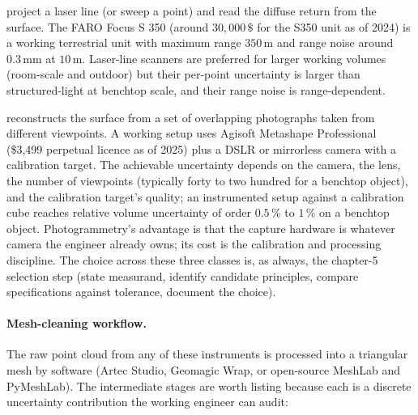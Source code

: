 project a
laser line (or sweep a point) and read the diffuse return from the
surface. The FARO Focus S 350 (around $30{,}000 \,\$ $ for the
S350 unit as of 2024) is a working terrestrial unit with maximum
range $350 \,\si{\meter}$ and range noise around $0.3 \,\si
{\milli\meter}$ at $10 \,\si{\meter}$. Laser-line scanners are
preferred for larger working volumes (room-scale and outdoor) but
their per-point uncertainty is larger than structured-light at
benchtop scale, and their range noise is range-dependent.

 reconstructs the surface from a set of
overlapping photographs taken from different viewpoints. A working
setup uses Agisoft Metashape Professional (\$3{,}499 perpetual
licence as of 2025) plus a DSLR or mirrorless camera with a
calibration target. The achievable uncertainty depends on the
camera, the lens, the number of viewpoints (typically forty to
two hundred for a benchtop object), and the calibration target's
quality; an instrumented setup against a calibration cube reaches
relative volume uncertainty of order $0.5\,\%$ to $1\,\%$ on a
benchtop object. Photogrammetry's advantage is that the capture
hardware is whatever camera the engineer already owns; its cost is
the calibration and processing discipline. The choice across these
three classes is, as always, the chapter-5 selection step (state
measurand, identify candidate principles, compare specifications
against tolerance, document the choice).

\paragraph{Mesh-cleaning workflow.}
The raw point cloud from any of these instruments is processed
into a triangular mesh by software (Artec Studio, Geomagic Wrap,
or open-source MeshLab and PyMeshLab). The intermediate stages are
worth listing because each is a discrete uncertainty contribution
the working engineer can audit:

